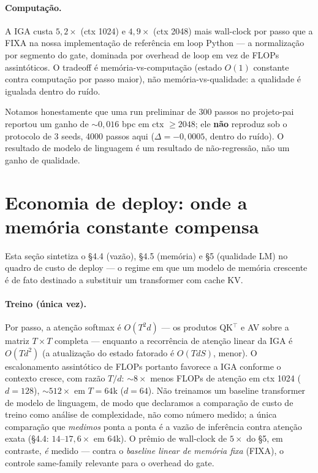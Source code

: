 \documentclass[11pt]{article}
\begin{document}
\paragraph{Computa\c{c}\~ao.} A IGA custa $5{,}2\times$ (ctx 1024) e
$4{,}9\times$ (ctx 2048) mais wall-clock por passo que a FIXA na nossa
implementa\c{c}\~ao de refer\^encia em loop Python --- a normaliza\c{c}\~ao por
segmento do gate, dominada por overhead de loop em vez de FLOPs assint\'oticos. O
tradeoff \'e mem\'oria-vs-computa\c{c}\~ao (estado $O(1)$ constante contra
computa\c{c}\~ao por passo maior), n\~ao mem\'oria-vs-qualidade: a qualidade \'e
igualada dentro do ru\'ido.

Notamos honestamente que uma run preliminar de 300 passos no projeto-pai reportou
um ganho de $\sim$$0{,}016$ bpc em ctx $\ge 2048$; ele \textbf{n\~ao} reproduz sob
o protocolo de 3 seeds, 4000 passos aqui ($\Delta=-0{,}0005$, dentro do
ru\'ido). O resultado de modelo de linguagem \'e um resultado de
n\~ao-regress\~ao, n\~ao um ganho de qualidade.

\section{Economia de deploy: onde a mem\'oria constante compensa}

Esta se\c{c}\~ao sintetiza o \S4.4 (vaz\~ao), \S4.5 (mem\'oria) e \S5 (qualidade
LM) no quadro de custo de deploy --- o regime em que um modelo de mem\'oria
crescente \'e de fato destinado a substituir um transformer com cache KV.

\paragraph{Treino (\'unica vez).} Por passo, a aten\c{c}\~ao softmax \'e
$O(T^2 d)$ --- os produtos QK$^\top$ e AV sobre a matriz $T\!\times\!T$ completa
--- enquanto a recorr\^encia de aten\c{c}\~ao linear da IGA \'e $O(Td^2)$ (a
atualiza\c{c}\~ao do estado fatorado \'e $O(TdS)$, menor). O escalonamento
assint\'otico de FLOPs portanto favorece a IGA conforme o contexto cresce, com
raz\~ao $T/d$: $\sim$$8\times$ menos FLOPs de aten\c{c}\~ao em ctx 1024
($d=128$), $\sim$$512\times$ em $T=64$k ($d=64$). N\~ao treinamos um baseline
transformer de modelo de linguagem, de modo que declaramos a compara\c{c}\~ao de
custo de treino como an\'alise de complexidade, n\~ao como n\'umero medido; a
\'unica compara\c{c}\~ao que \emph{medimos} ponta a ponta \'e a vaz\~ao de
infer\^encia contra aten\c{c}\~ao exata (\S4.4: $14$--$17{,}6\times$ em $64$k). O
pr\^emio de wall-clock de $5\times$ do \S5, em contraste, \emph{\'e} medido ---
contra o \emph{baseline linear de mem\'oria fixa} (FIXA), o controle
same-family relevante para o overhead do gate.
\end{document}
